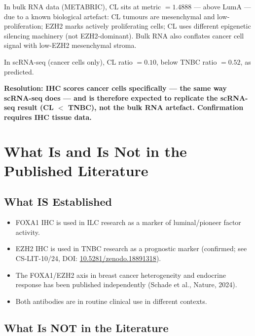 \documentclass[12pt, a4paper]{article}
\begin{document}
In bulk RNA data (METABRIC), CL sits at
metric $= 1.4888$ --- above LumA --- due to
a known biological artefact: CL tumours are
mesenchymal and low-proliferation; EZH2 marks
actively proliferating cells; CL uses different
epigenetic silencing machinery (not EZH2-dominant).
Bulk RNA also conflates cancer cell signal with
low-EZH2 mesenchymal stroma.

In scRNA-seq (cancer cells only), CL ratio
$= 0.10$, below TNBC ratio $= 0.52$, as predicted.

\textbf{Resolution: IHC scores cancer cells
specifically --- the same way scRNA-seq does ---
and is therefore expected to replicate the
scRNA-seq result (CL $< $ TNBC), not the bulk
RNA artefact. Confirmation requires IHC tissue
data.}

\section{What Is and Is Not in the Published
Literature}

\subsection{What IS Established}

\begin{itemize}
    \item FOXA1 IHC is used in ILC research
    as a marker of luminal/pioneer factor
    activity.
    \item EZH2 IHC is used in TNBC research
    as a prognostic marker (confirmed;
    see CS-LIT-10/24, DOI:
    \href{https://doi.org/10.5281/zenodo.18891318}
    {10.5281/zenodo.18891318}).
    \item The FOXA1/EZH2 axis in breast cancer
    heterogeneity and endocrine response has been
    published independently (Schade et al.,
    Nature, 2024).
    \item Both antibodies are in routine clinical
    use in different contexts.
\end{itemize}

\subsection{What Is NOT in the Literature}
\end{document}
